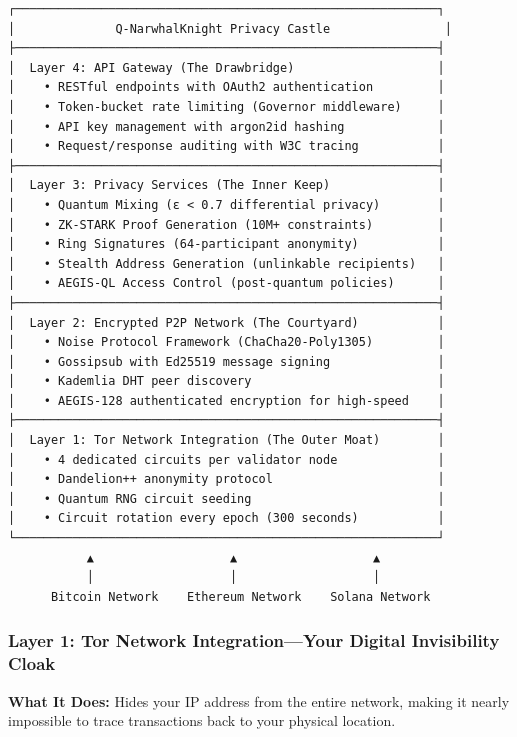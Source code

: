 \documentclass[11pt,a4paper]{article}
\begin{document}
\begin{verbatim}
┌───────────────────────────────────────────────────────────┐
│              Q-NarwhalKnight Privacy Castle                │
├───────────────────────────────────────────────────────────┤
│  Layer 4: API Gateway (The Drawbridge)                    │
│    • RESTful endpoints with OAuth2 authentication         │
│    • Token-bucket rate limiting (Governor middleware)     │
│    • API key management with argon2id hashing             │
│    • Request/response auditing with W3C tracing           │
├───────────────────────────────────────────────────────────┤
│  Layer 3: Privacy Services (The Inner Keep)               │
│    • Quantum Mixing (ε < 0.7 differential privacy)        │
│    • ZK-STARK Proof Generation (10M+ constraints)         │
│    • Ring Signatures (64-participant anonymity)           │
│    • Stealth Address Generation (unlinkable recipients)   │
│    • AEGIS-QL Access Control (post-quantum policies)      │
├───────────────────────────────────────────────────────────┤
│  Layer 2: Encrypted P2P Network (The Courtyard)           │
│    • Noise Protocol Framework (ChaCha20-Poly1305)         │
│    • Gossipsub with Ed25519 message signing               │
│    • Kademlia DHT peer discovery                          │
│    • AEGIS-128 authenticated encryption for high-speed    │
├───────────────────────────────────────────────────────────┤
│  Layer 1: Tor Network Integration (The Outer Moat)        │
│    • 4 dedicated circuits per validator node              │
│    • Dandelion++ anonymity protocol                       │
│    • Quantum RNG circuit seeding                          │
│    • Circuit rotation every epoch (300 seconds)           │
└───────────────────────────────────────────────────────────┘
           ▲                   ▲                   ▲
           │                   │                   │
      Bitcoin Network    Ethereum Network    Solana Network
\end{verbatim}

\subsubsection{Layer 1: Tor Network Integration—Your Digital Invisibility Cloak}

\textbf{What It Does:} Hides your IP address from the entire network, making it nearly impossible to trace transactions back to your physical location.
\end{document}
